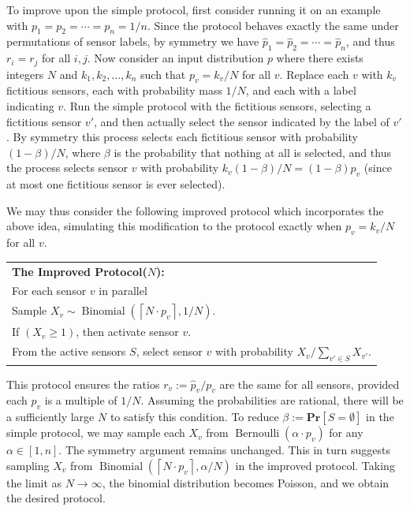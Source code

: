 \documentclass{sig-alternate-dan}
\numberwithin{equation}{section}
\newcommand{\probnull}{\ensuremath{\beta}}
\newcommand{\sensor}{\ensuremath{v}}
\newcommand{\psamp}{\ensuremath{\hat{p}}}
\newcommand{\Bernoulli}[1]{\ensuremath{\operatorname{Bernoulli}({#1})}}
\newcommand{\Binomial}[1]{\ensuremath{\operatorname{Binomial}({#1})}}
\newcommand{\prob}[1]{\ensuremath{\mathbf{Pr}\left[#1\right] }}
\newcommand{\ceil}[1]{\ensuremath{\left\lceil#1\right\rceil}}
\begin{document}
To improve upon the simple protocol, first consider running it on an
example with $p_1 = p_2 = \cdots = p_n = 1/n$.  Since the protocol
behaves exactly the same under permutations of sensor labels, by
symmetry we have $\psamp_{1} = \psamp_{2} = \cdots = \psamp_{n}$, and
thus $r_i = r_j$ for all $i,j$.  Now consider an input distribution
$p$ where there exists integers $N$ and $k_1, k_2, \ldots, k_n$ such
that $p_{\sensor} = k_{\sensor}/N$ for all $\sensor$.  Replace each
$\sensor$ with $k_{\sensor}$ fictitious sensors, each with probability
mass $1/N$, and each with a label indicating $\sensor$.  Run the
simple protocol with the fictitious sensors, selecting a fictitious
sensor $\sensor'$, and then actually select the sensor indicated by
the label of $\sensor'$.  By symmetry this process selects each
fictitious sensor with probability $(1-\probnull)/N$, where
$\probnull$ is the probability that nothing at all is selected, and
thus the process selects sensor $\sensor$ with probability
$k_{\sensor}(1-\probnull)/N = (1-\probnull)p_{\sensor}$ (since at most
one fictitious sensor is ever selected).



We may thus consider the following improved protocol which
incorporates the above idea, simulating this modification to the
protocol exactly when $p_{\sensor} = k_{\sensor}/N$ for all $\sensor$.

\begin{center}
\begin{tabular}{|p{7.6cm}|}
\hline
\textbf{The Improved Protocol($N$):}\\
\hspace{0cm} For each sensor $\sensor$ in parallel\\
\hspace{0.5cm} Sample $X_{\sensor} \sim \Binomial{\ceil{N \cdot
    p_{\sensor}}, 1/N}$.\\
\hspace{0.5cm} If $(X_{\sensor} \ge 1)$, then activate sensor $\sensor$.\\ 
%
\hspace{0cm} From the active sensors $S$, select sensor $\sensor$ with
probability $X_{\sensor}/\sum_{\sensor'\in S} X_{\sensor'}$.\\
%
%
%
%
%
%
\hline
\end{tabular}
\end{center}

This protocol ensures the ratios $r_{\sensor} := \psamp_{\sensor} /
p_{\sensor}$ are the same for all sensors, provided each $p_{\sensor}$
is a multiple of $1/N$.  Assuming the probabilities are rational,
there will be a sufficiently large $N$ to satisfy this condition.
To reduce $\probnull := \prob{S = \emptyset}$ in the simple protocol, we
may sample each $X_{\sensor}$ from $\Bernoulli{\alpha \cdot p_{\sensor}}$ for any
$\alpha \in [1, n]$.  The symmetry argument remains unchanged.
This in turn suggests sampling $X_{\sensor}$ from 
$\Binomial{\ceil{N \cdot p_{\sensor}}, \alpha/N}$ in the improved
protocol.  Taking the limit as $N \to \infty$, the binomial
distribution becomes Poisson, and we obtain the desired protocol.
\end{document}
